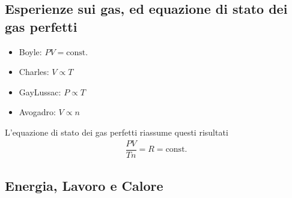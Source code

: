 \documentclass[letterpaper,10pt,italian]{jupyterBook}
\begin{document}
\subsection{Esperienze sui gas, ed equazione di stato dei gas perfetti}
\label{\detokenize{ch/thermodynamics/foundation-experiments:esperienze-sui-gas-ed-equazione-di-stato-dei-gas-perfetti}}\label{\detokenize{ch/thermodynamics/foundation-experiments:physics-hs-thermodynamics-foundation-experiments-gas}}\begin{itemize}
\item {} 
\sphinxAtStartPar
Boyle: \(PV = \text{const.}\)

\item {} 
\sphinxAtStartPar
Charles: \(V \propto T\)

\item {} 
\sphinxAtStartPar
Gay\sphinxhyphen{}Lussac: \(P \propto T\)

\item {} 
\sphinxAtStartPar
Avogadro: \(V \propto n\)

\end{itemize}

\sphinxAtStartPar
L’equazione di stato dei gas perfetti riassume questi risultati
\begin{equation*}
\begin{split}\dfrac{P V}{T n} = R = \text{const.}\end{split}
\end{equation*}

\subsection{Energia, Lavoro e Calore}
\label{\detokenize{ch/thermodynamics/foundation-experiments:energia-lavoro-e-calore}}\label{\detokenize{ch/thermodynamics/foundation-experiments:physics-hs-thermodynamics-foundation-experiments-heat-work}}
\end{document}

